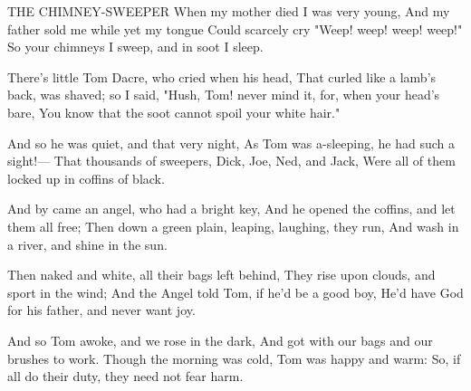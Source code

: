 THE CHIMNEY-SWEEPER
   When my mother died I was very young,
   And my father sold me while yet my tongue
   Could scarcely cry "Weep! weep! weep! weep!"
   So your chimneys I sweep, and in soot I sleep.

   There's little Tom Dacre, who cried when his head,
   That curled like a lamb's back, was shaved; so I said,
   "Hush, Tom! never mind it, for, when your head's bare,
   You know that the soot cannot spoil your white hair."
   
   And so he was quiet, and that very night,
   As Tom was a-sleeping, he had such a sight!—
   That thousands of sweepers, Dick, Joe, Ned, and Jack,
   Were all of them locked up in coffins of black.
   
   And by came an angel, who had a bright key,
   And he opened the coffins, and let them all free;
   Then down a green plain, leaping, laughing, they run,
   And wash in a river, and shine in the sun.
   
   Then naked and white, all their bags left behind,
   They rise upon clouds, and sport in the wind;
   And the Angel told Tom, if he'd be a good boy,
   He'd have God for his father, and never want joy.
   
   And so Tom awoke, and we rose in the dark,
   And got with our bags and our brushes to work.
   Though the morning was cold, Tom was happy and warm:
   So, if all do their duty, they need not fear harm.